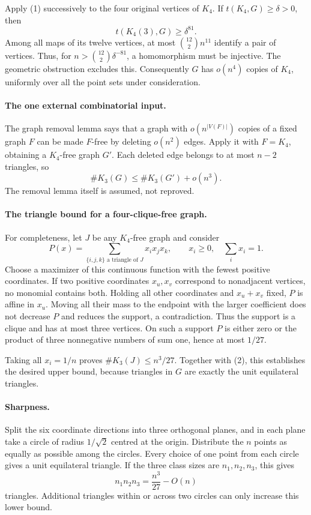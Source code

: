 Apply (1) successively to the four original vertices of \(K_4\). If \(t(K_4,G)\geq\delta>0\), then
\[
 t(K_4(3),G)\geq\delta^{81}.
\]
Among all maps of its twelve vertices, at most \(\binom{12}{2}n^{11}\) identify a pair of vertices. Thus, for \(n>\binom{12}{2}\delta^{-81}\), a homomorphism must be injective. The geometric obstruction excludes this. Consequently \(G\) has \(o(n^4)\) copies of \(K_4\), uniformly over all the point sets under consideration.

\paragraph{The one external combinatorial input.}
The graph removal lemma says that a graph with \(o(n^{|V(F)|})\) copies of a fixed graph \(F\) can be made \(F\)-free by deleting \(o(n^2)\) edges. Apply it with \(F=K_4\), obtaining a \(K_4\)-free graph \(G'\). Each deleted edge belongs to at most \(n-2\) triangles, so
\[
 \#K_3(G)\leq\#K_3(G')+o(n^3). \tag{2}
\]
The removal lemma itself is assumed, not reproved.

\paragraph{The triangle bound for a four-clique-free graph.}
For completeness, let \(J\) be any \(K_4\)-free graph and consider
\[
 P(x)=\sum_{\{i,j,k\}\text{ a triangle of }J}x_i x_j x_k,
 \qquad x_i\geq0,\quad\sum_i x_i=1.
\]
Choose a maximizer of this continuous function with the fewest positive coordinates. If two positive coordinates \(x_u,x_v\) correspond to nonadjacent vertices, no monomial contains both. Holding all other coordinates and \(x_u+x_v\) fixed, \(P\) is affine in \(x_u\). Moving all their mass to the endpoint with the larger coefficient does not decrease \(P\) and reduces the support, a contradiction. Thus the support is a clique and has at most three vertices. On such a support \(P\) is either zero or the product of three nonnegative numbers of sum one, hence at most \(1/27\).

Taking all \(x_i=1/n\) proves \(\#K_3(J)\leq n^3/27\). Together with (2), this establishes the desired upper bound, because triangles in \(G\) are exactly the unit equilateral triangles.

\paragraph{Sharpness.}
Split the six coordinate directions into three orthogonal planes, and in each plane take a circle of radius \(1/\sqrt2\) centred at the origin. Distribute the \(n\) points as equally as possible among the circles. Every choice of one point from each circle gives a unit equilateral triangle. If the three class sizes are \(n_1,n_2,n_3\), this gives
\[
 n_1n_2n_3=\frac{n^3}{27}-O(n)
\]
triangles. Additional triangles within or across two circles can only increase this lower bound.

